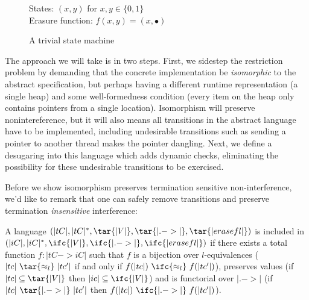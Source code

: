 \begin{figure}
    States: $(x,y)$ for $x,y \in \{0,1\}$ \\
    Erasure function: $f(x,y) = (x,\bullet)$

    \begin{center}\end{center}

    \label{fig:trivial-sm}
    \caption{A trivial state machine}
\end{figure}

The approach we will take is in two steps.  First, we sidestep the
restriction problem by demanding that the concrete implementation be
\emph{isomorphic} to the abstract specification, but perhaps having a different
runtime representation (a single heap) and some well-formedness
condition (every item on the heap only contains pointers from a single
location).  Isomorphism will preserve nonintereference, but it will also means all
transitions in the abstract language have to be implemented, including
undesirable transitions such as sending a pointer to another thread makes
the pointer dangling.  Next, we define a desugaring into this language
which adds dynamic checks, eliminating the possibility for these undesirable
transitions to be exercised.


Before we show isomorphism preserves termination sensitive
non-interference, we'd like to remark that one can safely remove transitions
and preserve termination \emph{insensitive} interference:

\begin{definition}
    A language $(|tC|, |tC|^*, \tar{|V|}, \tar{|.->|}, \tar{|erasef l|})$ is
    included in $(|iC|, |iC|^*, \ifc{|V|}, \ifc{|.->|}, \ifc{|erasef
    l|})$ if there exists a total function $f : |tC -> iC|$ such that
    $f$ is a bijection over $l$-equivalences ($|tc|\ \tar{\approx_l}\
    |tc'|$ if and only if $f(|tc|)\ \ifc{\approx_l}\ f(|tc'|)$),
    preserves values (if $|tc| \subseteq \tar{|V|}$ then $|ic| \subseteq
    \ifc{|V|}$) and is functorial over $|.->|$ (if $|tc|\ \tar{|.->|}\
    |tc'|$ then $f(|tc|)\ \ifc{|.->|}\ f(|tc'|)$).
\end{definition}

